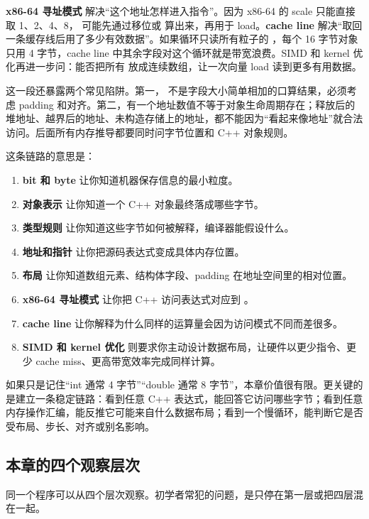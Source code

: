 \textbf{x86-64 寻址模式} 解决“这个地址怎样进入指令”。因为 x86-64 的 scale 只能直接取 1、2、4、8， 可能先通过移位或  算出来，再用于 load。\textbf{cache line} 解决“取回一条缓存线后用了多少有效数据”。如果循环只读所有粒子的 ，每个 16 字节对象只用 4 字节，cache line 中其余字段对这个循环就是带宽浪费。SIMD 和 kernel 优化再进一步问：能否把所有  放成连续数组，让一次向量 load 读到更多有用数据。

这一段还暴露两个常见陷阱。第一， 不是字段大小简单相加的口算结果，必须考虑 padding 和对齐。第二，有一个地址数值不等于对象生命周期存在；释放后的堆地址、越界后的地址、未构造存储上的地址，都不能因为“看起来像地址”就合法访问。后面所有内存推导都要同时问字节位置和 C++ 对象规则。

这条链路的意思是：

\begin{enumerate}
  \item \textbf{bit 和 byte} 让你知道机器保存信息的最小粒度。
  \item \textbf{对象表示} 让你知道一个 C++ 对象最终落成哪些字节。
  \item \textbf{类型规则} 让你知道这些字节如何被解释，编译器能假设什么。
  \item \textbf{地址和指针} 让你把源码表达式变成具体内存位置。
  \item \textbf{布局} 让你知道数组元素、结构体字段、padding 在地址空间里的相对位置。
  \item \textbf{x86-64 寻址模式} 让你把 C++ 访问表达式对应到 。
  \item \textbf{cache line} 让你解释为什么同样的运算量会因为访问模式不同而差很多。
  \item \textbf{SIMD 和 kernel 优化} 则要求你主动设计数据布局，让硬件以更少指令、更少 cache miss、更高带宽效率完成同样计算。
\end{enumerate}

如果只是记住“int 通常 4 字节”“double 通常 8 字节”，本章价值很有限。更关键的是建立一条稳定链路：看到任意 C++ 表达式，能回答它访问哪些字节；看到任意内存操作汇编，能反推它可能来自什么数据布局；看到一个慢循环，能判断它是否受布局、步长、对齐或别名影响。

\subsection{本章的四个观察层次}

同一个程序可以从四个层次观察。初学者常犯的问题，是只停在第一层或把四层混在一起。

